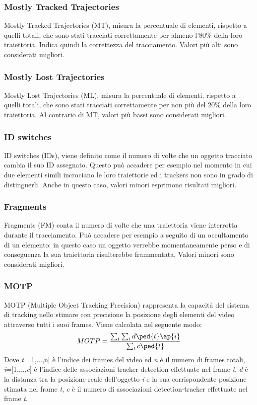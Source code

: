 \subsubsection{Mostly Tracked Trajectories}
Mostly Tracked Trajectories (MT), misura la percentuale di elementi, rispetto a quelli totali, che sono stati tracciati correttamente per almeno l'80\% della loro traiettoria. Indica quindi la correttezza del tracciamento. Valori più alti sono considerati migliori.
\subsubsection{Mostly Lost Trajectories}
Mostly Lost Trajectories (ML), misura la percentuale di elementi, rispetto a quelli totali, che sono stati tracciati correttamente per non più del 20\% della loro traiettoria. Al contrario di MT, valori più bassi sono considerati migliori.
\subsubsection{ID switches}
ID switches (IDs), viene definito come il numero di volte che un oggetto tracciato cambia il suo ID assegnato. Questo può accadere per esempio nel momento in cui due elementi simili incrociano le loro traiettorie ed i trackers non sono in grado di distinguerli. Anche in questo caso, valori minori esprimono risultati migliori.
\subsubsection{Fragments}
Fragments (FM) conta il numero di volte che una traiettoria viene interrotta durante il tracciamento. Può accadere per esempio a seguito di un occultamento di un elemento: in questo caso un oggetto verrebbe momentaneamente perso e di conseguenza la sua traiettoria risulterebbe frammentata. Valori minori sono considerati migliori. 
\subsubsection{MOTP}
MOTP (Multiple Object Tracking Precision)\cite{MOTmetrics} rappresenta la capacità del sistema di tracking nello stimare con precisione la posizione degli elementi del video attraverso tutti i suoi frames. Viene calcolata nel seguente modo:
\[
MOTP = \frac{\sum_{t}^{}\sum_{i}^{}d\ped{t}\ap{i}}{\sum_{t}^{}c\ped{t}}
\]
Dove \textit{t}=[1,...,n] è l'indice dei frames del video ed \textit{n} è il numero di frames totali, \textit{i}=[1,...,\textit{c}] è l'indice delle associazioni tracker-detection effettuate nel frame \textit{t}, \textit{d} è la distanza tra la posizione reale dell'oggetto \textit{i} e la sua corrispondente posizione stimata nel frame \textit{t}, \textit{c} è il numero di associazioni detection-tracker effettuate nel frame \textit{t}.
